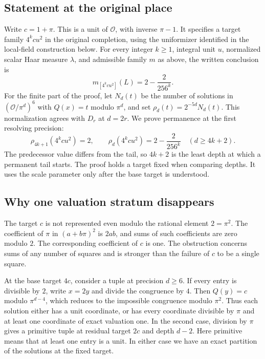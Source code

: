\documentclass[12pt,letterpaper]{article}
\begin{document}
\subsection{Statement at the original place}
Write $c=1+\pi$. This is a unit of $\mathcal O$, with inverse $\pi-1$. It specifies a target family $4^kcu^2$ in the original completion, using the uniformizer identified in the local-field construction below. For every integer $k\geq 1$, integral unit $u$, normalized scalar Haar measure $\lambda$, and admissible family $m$ as above, the written conclusion is
\begin{equation}
  m_{[4^kcu^2]}(L)=2-\frac{2}{256^k}.
  \label{eq:companion-mass}
\end{equation}
For the finite part of the proof, let $N_d(t)$ be the number of solutions in $(\mathcal O/\pi^d)^6$ with $Q(x)=t$ modulo $\pi^d$, and set $\rho_d(t)=2^{-5d}N_d(t)$. This normalization agrees with $D_r$ at $d=2r$. We prove permanence at the first resolving precision:
\[
  \rho_{4k+1}(4^kcu^2)=2,\qquad
  \rho_d(4^kcu^2)=2-\frac{2}{256^k}\quad(d\geq 4k+2).
\]
The predecessor value differs from the tail, so $4k+2$ is the least depth at which a permanent tail starts. The proof holds a target fixed when comparing depths. It uses the scale parameter only after the base target is understood.

\subsection{Why one valuation stratum disappears}
The target $c$ is not represented even modulo the rational element $2=\pi^2$. The coefficient of $\pi$ in $(a+b\pi)^2$ is $2ab$, and sums of such coefficients are zero modulo $2$. The corresponding coefficient of $c$ is one. The obstruction concerns sums of any number of squares and is stronger than the failure of $c$ to be a single square.

At the base target $4c$, consider a tuple at precision $d\geq 6$. If every entry is divisible by $2$, write $x=2y$ and divide the congruence by $4$. Then $Q(y)=c$ modulo $\pi^{d-4}$, which reduces to the impossible congruence modulo $\pi^2$. Thus each solution either has a unit coordinate, or has every coordinate divisible by $\pi$ and at least one coordinate of exact valuation one. In the second case, division by $\pi$ gives a primitive tuple at residual target $2c$ and depth $d-2$. Here primitive means that at least one entry is a unit. In either case we have an exact partition of the solutions at the fixed target.
\end{document}
